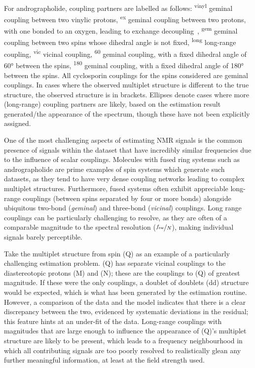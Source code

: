 \begin{table}
{    For andrographolide, coupling partners are labelled as follows:
    \textsuperscript{vinyl} geminal coupling between two vinylic protons,
    \textsuperscript{ex} geminal coupling between two protons, with one
    bonded to an oxygen, leading to exchange decoupling~\cite[Section
    2.6.1.5]{Claridge2016},
    \textsuperscript{gem} geminal coupling between two spins whose dihedral
    angle is not fixed,
    \textsuperscript{long} long-range coupling,
    \textsuperscript{vic} vicinal coupling,
    \textsuperscript{60} geminal coupling, with a fixed dihedral angle of
    \ang{60} between the spins,
    \textsuperscript{180} geminal coupling, with a fixed dihedral angle of
    \ang{180} between the spins.
    All cyclosporin couplings for the spins considered are geminal couplings.
    In cases where the observed multiplet structure is different to the true
    structure, the observed structure is in brackets. Ellipses denote cases
    where more (long-range) coupling partners are likely, based on the
    estimation result generated/the appearance of the spectrum, though these
    have not been explicitly assigned.
}
\label{tab:andro-multiplets}
\end{table}

One of the most challenging aspects of estimating \ac{NMR} signals is
the common presence of signals within the dataset that have incredibly similar
frequencies due to the influence of scalar couplings.
Molecules with fused ring systems such as andrographolide are prime examples of spin
systems which generate such datasets, as they tend to have very dense coupling
networks leading to complex multiplet structures. Furthermore, fused systems often
exhibit appreciable long-range couplings (between spins separated by four or
more bonds) alongside ubiquitous two-bond (\emph{geminal}) and three-bond
(\emph{vicinal}) couplings. Long range couplings can be particularly challenging to
resolve, as they are often of a comparable magnitude to the spectral resolution
($\nicefrac{f_{\mathrm{sw}}}{N}$), making individual signals barely perceptible.

Take the multiplet structure from spin (Q) as an example of a particularly
challenging estimation problem.
(Q) has separate vicinal couplings to the
diastereotopic protons (M) and (N); these are the couplings to
(Q) of greatest magnitude. If these were the only couplings, a doublet of doublets
(dd) structure would be expected, which is what has been generated by
the estimation routine.
However, a comparison of the data and
the model indicates that there is a clear discrepancy between the two,
evidenced by systematic deviations in the residual; this feature hints at an
under-fit of the data.
Long-range couplings with magnitudes that are large enough to influence the
appearance of (Q)'s multiplet structure are likely to be present, which leads
to a frequency neighbourhood in which all contributing signals are too poorly
resolved to realistically glean any further meaningful information, at least at
the field strength used.


